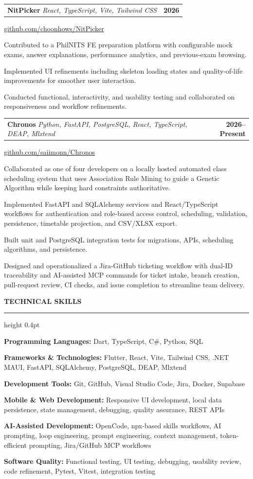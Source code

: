 \documentclass[10pt,letterpaper]{article}
\makeatletter
\newenvironment{cvitems}{%
  \begin{list}{\textbullet}{%
    \setlength{\leftmargin}{1.25em}%
    \setlength{\labelsep}{0.45em}%
    \setlength{\itemsep}{0pt}%
    \setlength{\topsep}{1.5pt}%
    \setlength{\parsep}{0pt}%
    \setlength{\partopsep}{0pt}%
  }%
}{\end{list}}
\newcommand{\cvsection}[1]{%
  \vspace{7pt}%
  {\fontsize{12}{13}\selectfont\bfseries\MakeUppercase{#1}}\par
  \vspace{2pt}\hrule height 0.4pt\vspace{4pt}%
}
\newcommand{\projectheading}[3]{%
  \begin{tabularx}{\textwidth}{@{}>{\raggedright\arraybackslash}Xr@{}}
    \textbf{#1} \textbar{} \textit{#2} & \textbf{#3}
  \end{tabularx}%
}
\makeatother
\begin{document}
\projectheading{NitPicker}{React, TypeScript, Vite, Tailwind CSS}{2026}
\href{https://github.com/choonhows/NitPicker}{github.com/choonhows/NitPicker}
\begin{cvitems}
  \item Contributed to a PhilNITS FE preparation platform with configurable mock exams, answer explanations, performance analytics, and previous-exam browsing.
  \item Implemented UI refinements including skeleton loading states and quality-of-life improvements for smoother user interaction.
  \item Conducted functional, interactivity, and usability testing and collaborated on responsiveness and workflow refinements.
\end{cvitems}
\vspace{2pt}

\projectheading{Chronos}{Python, FastAPI, PostgreSQL, React, TypeScript, DEAP, Mlxtend}{2026--Present}
\href{https://github.com/saiimonn/Chronos}{github.com/saiimonn/Chronos}
\begin{cvitems}
  \item Collaborated as one of four developers on a locally hosted automated class scheduling system that uses Association Rule Mining to guide a Genetic Algorithm while keeping hard constraints authoritative.
  \item Implemented FastAPI and SQLAlchemy services and React/TypeScript workflows for authentication and role-based access control, scheduling, validation, persistence, timetable projection, and CSV/XLSX export.
  \item Built unit and PostgreSQL integration tests for migrations, APIs, scheduling algorithms, and persistence.
  \item Designed and operationalized a Jira-GitHub ticketing workflow with dual-ID traceability and AI-assisted MCP commands for ticket intake, branch creation, pull-request review, CI checks, and issue completion to streamline team delivery.
\end{cvitems}

\cvsection{Technical Skills}
\textbf{Programming Languages:} Dart, TypeScript, C\#, Python, SQL\par
\textbf{Frameworks \& Technologies:} Flutter, React, Vite, Tailwind CSS, .NET MAUI, FastAPI, SQLAlchemy, PostgreSQL, DEAP, Mlxtend\par
\textbf{Development Tools:} Git, GitHub, Visual Studio Code, Jira, Docker, Supabase\par
\textbf{Mobile \& Web Development:} Responsive UI development, local data persistence, state management, debugging, quality assurance, REST APIs\par
\textbf{AI-Assisted Development:} OpenCode, npx-based skills workflows, AI prompting, loop engineering, prompt engineering, context management, token-efficient prompting, Jira/GitHub MCP workflows\par
\textbf{Software Quality:} Functional testing, UI testing, debugging, usability review, code refinement, Pytest, Vitest, integration testing
\end{document}
